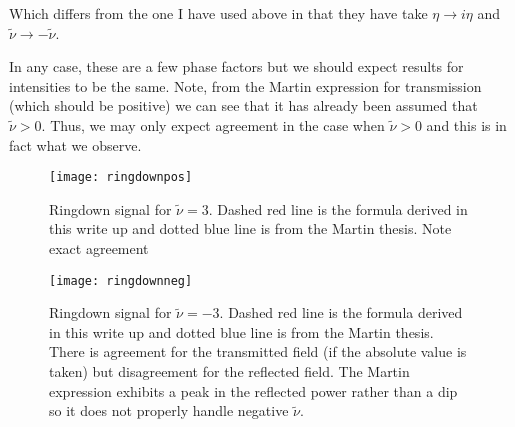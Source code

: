 \documentclass[12pt]{article}
\begin{document}
Which differs from the one I have used above in that they have take $\eta\rightarrow i\eta$ and $\tilde{\nu}\rightarrow - \tilde{\nu}$.

In any case, these are a few phase factors but we should expect results for intensities to be the same.
Note, from the Martin expression for transmission (which should be positive) we can see that it has already been assumed that $\tilde{\nu} > 0$. 
Thus, we may only expect agreement in the case when $\tilde{\nu} > 0$ and this is in fact what we observe.

\begin{figure}[bt!] 
\texttt{[image: ringdownpos]}
\caption{Ringdown signal for $\tilde{\nu} = 3$. Dashed red line is the formula derived in this write up and dotted blue line is from the Martin thesis. Note exact agreement}
\end{figure}
\begin{figure}[bt!] 
\texttt{[image: ringdownneg]}
\caption{Ringdown signal for $\tilde{\nu} = -3$. Dashed red line is the formula derived in this write up and dotted blue line is from the Martin thesis. There is agreement for the transmitted field (if the absolute value is taken) but disagreement for the reflected field. The Martin expression exhibits a peak in the reflected power rather than a dip so it does not properly handle negative $\tilde{\nu}$.}
\end{figure}
\end{document}
